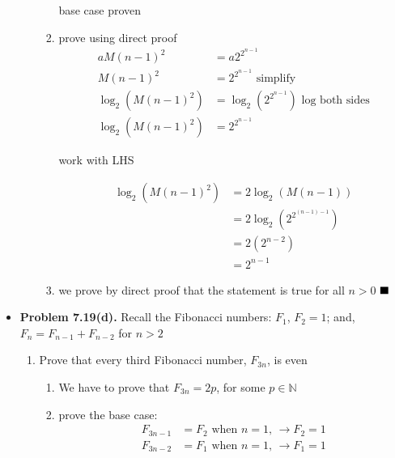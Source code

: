\documentclass{article}
\begin{document}
\begin{itemize}
\begin{enumerate}[label=(a)]
\begin{enumerate}[label=(\roman*)]
                \begin{center}
                    base case proven
                \end{center}
                \item prove using direct proof
                \begin{align*}
                    aM(n-1)^2 &= a2^{2^{n-1}}\\
                    M(n-1)^2 &= 2^{2^{n-1}} \text{ simplify}\\
                    \log_{2}(M(n-1)^2) &= \log_2(2^{2^{n-1}}) \text{ log both sides}\\
                    \log_{2}(M(n-1)^2) &= 2^{2^{n-1}}
                \end{align*}
                \begin{center}
                    work with LHS
                \end{center}
                \begin{align*}
                    \log_{2}(M(n-1)^2) & = 2 \log_{2}(M(n-1))\\
                                       & = 2 \log_{2}(2^{2^{(n-1) - 1}})\\
                                       & = 2(2^{n-2})\\
                                       & = 2^{n-1}
                \end{align*}
                \item we prove by direct proof that the statement is true for all $n > 0$ $\hfill\blacksquare$
            \end{enumerate}
        \end{enumerate}
        \item \textbf{Problem 7.19(d).} Recall the Fibonacci numbers: $F_1$, $F_2 = 1$; and, $F_n = F_{n-1} + F_{n-2}$ for $n > 2$
        \begin{enumerate}[label=(d)]
            \item Prove that every third Fibonacci number, $F_{3n}$, is even
            \begin{enumerate}[label=(\roman*)]
                \item We have to prove that $F_{3n} = 2p$, for some $p \in \mathbb{N}$
                \item prove the base case:
                \begin{align*}
                    F_{3n-1} &= F_2 \text{ when $n=1$, } \rightarrow F_2 = 1\\
                    F_{3n-2} &= F_1 \text{ when $n=1$, } \rightarrow F_1 = 1

\end{align*}
\end{enumerate}
\end{enumerate}
\end{itemize}
\end{document}
